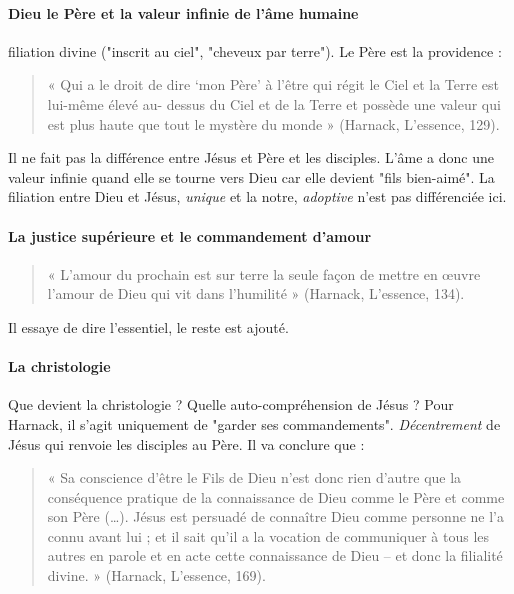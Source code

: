 \paragraph{Dieu le Père et la valeur infinie de l’âme humaine}  filiation divine ("inscrit au ciel", "cheveux par terre"). Le Père est la providence : 

\begin{quote}
    « Qui a le droit de dire ‘mon Père’ à l’être qui régit le Ciel et la Terre est lui-même élevé au- dessus du Ciel et de la Terre et possède une valeur qui est plus haute que tout le mystère du monde » (Harnack, L’essence, 129).
\end{quote}

Il ne fait pas la différence entre Jésus et Père et les disciples. L'âme a donc une valeur infinie quand elle se tourne vers Dieu car elle devient "fils bien-aimé". La filiation entre Dieu et Jésus, \textit{unique} et la notre, \textit{adoptive} n'est pas différenciée ici.




\paragraph{La justice supérieure et le commandement d’amour}  

\begin{quote}
    « L’amour du prochain est sur terre la seule façon de mettre en œuvre l’amour de Dieu qui vit dans l’humilité » (Harnack, L’essence, 134).
\end{quote}
Il essaye de dire l'essentiel, le reste est ajouté.

\paragraph{La christologie}   Que devient la christologie ? Quelle auto-compréhension de Jésus ? Pour Harnack, il s'agit uniquement de "garder ses commandements". \textit{Décentrement} de Jésus qui renvoie les disciples au Père. Il va conclure que : 
\begin{quote}
    « Sa conscience d’être le Fils de Dieu n’est donc rien d’autre que la conséquence pratique de la connaissance de Dieu comme le Père et comme son Père (…). Jésus est persuadé de connaître Dieu comme personne ne l’a connu avant lui ; et il sait qu’il a la vocation de communiquer à tous les autres en parole et en acte cette connaissance de Dieu – et donc la filialité divine. » (Harnack, L’essence, 169).
\end{quote}


